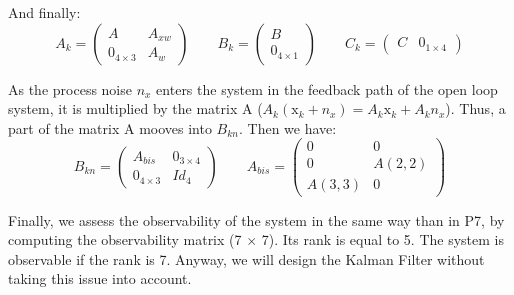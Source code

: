 And finally:
\begin{equation*}
  A_k = \begin{pmatrix}
   A & A_{xw}\\
   0_{4\times 3} & A_w
\end{pmatrix}
\qquad B_{k} = \begin{pmatrix}
	B\\
	0_{4\times 1}
\end{pmatrix}
\qquad C_{k} = \begin{pmatrix}
	C & 0_{1\times 4}
\end{pmatrix}
\end{equation*}

As the process noise $n_x$ enters the system in the feedback path of the open loop system, it is multiplied by the matrix A ($A_k (\text{x}_k+n_x) = A_k \text{x}_k + A_k n_x$). Thus, a part of the matrix A mooves into $B_{kn}$. Then we have:
\begin{equation*}
B_{kn} = \begin{pmatrix}
	A_{bis} & 0_{3\times 4} \\
	0_{4\times 3} & Id_4
\end{pmatrix}
\qquad A_{bis} = \begin{pmatrix}
	0 & 0 \\
	0 & A(2,2)\\
	A(3,3) & 0
\end{pmatrix}
\end{equation*}

Finally, we assess the observability of the system in the same way than in P7, by computing the observability matrix (7 $\times$ 7). Its rank is equal to 5. The system is observable if the rank is 7. Anyway, we will design the Kalman Filter without taking this issue into account.